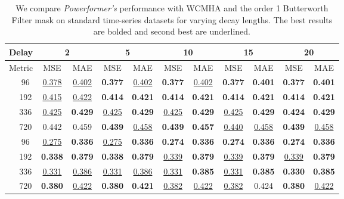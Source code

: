\begin{table*}[h]
    \centering
    \caption{We compare \emph{Powerformer's} performance with WCMHA and the order 1 Butterworth Filter mask \fbwo{} on standard time-series datasets for varying decay lengths. The best results are bolded and second best are underlined.}
    \label{tab:powerformer_butter1_results}
    \vskip 0.1in
    \begin{tabular}{c|c|cc|cc|cc|cc|cc}
	\toprule
	\multicolumn{2}{c|}{Delay}  & \multicolumn{2}{c|}{2} & \multicolumn{2}{c|}{5} & \multicolumn{2}{c|}{10} & \multicolumn{2}{c|}{15} & \multicolumn{2}{c}{20} \\
	\midrule
	\multicolumn{2}{c|}{Metric} & MSE & MAE & MSE & MAE & MSE & MAE & MSE & MAE & MSE & MAE \\
	\midrule
	\multirow{4}{*}{\rotatebox[origin=c]{90}{\text{ETTh1}}}
         & 96 &  \underline{0.378} & \underline{0.402} &  \textbf{0.377} & \underline{0.402} &  \textbf{0.377} & \underline{0.402} &  \textbf{0.377} & \textbf{0.401} &  \textbf{0.377} & \textbf{0.401} \\
	   & 192 &  \underline{0.415} & \underline{0.422} &  \textbf{0.414} & \textbf{0.421} &  \textbf{0.414} & \textbf{0.421} &  \textbf{0.414} & \textbf{0.421} &  \textbf{0.414} & \textbf{0.421} \\
		 & 336 &  \underline{0.425} & \textbf{0.429} &  \underline{0.425} & \textbf{0.429} &  \underline{0.425} & \textbf{0.429} &  \underline{0.425} & \textbf{0.429} &  \textbf{0.424} & \textbf{0.429} \\
		 & 720 &  0.442 & 0.459 &  \textbf{0.439} & \underline{0.458} &  \textbf{0.439} & \textbf{0.457} &  \underline{0.440} & \underline{0.458} &  \textbf{0.439} & \underline{0.458} \\ 
	\midrule
	\multirow{4}{*}{\rotatebox[origin=c]{90}{\text{ETTh2}}}
		 & 96 &  \underline{0.275} & \textbf{0.336} &  \underline{0.275} & \textbf{0.336} &  \textbf{0.274} & \textbf{0.336} &  \textbf{0.274} & \textbf{0.336} &  \textbf{0.274} & \textbf{0.336} \\
		 & 192 &  \textbf{0.338} & \textbf{0.379} &  \textbf{0.338} & \textbf{0.379} &  \underline{0.339} & \textbf{0.379} &  \underline{0.339} & \textbf{0.379} &  \underline{0.339} & \textbf{0.379} \\
		 & 336 &  \underline{0.331} & \underline{0.386} &  \underline{0.331} & \underline{0.386} &  \underline{0.331} & \textbf{0.385} &  \underline{0.331} & \textbf{0.385} &  \textbf{0.330} & \textbf{0.385} \\
		 & 720 &  \textbf{0.380} & \underline{0.422} &  \textbf{0.380} & \textbf{0.421} &  \underline{0.382} & \underline{0.422} &  \underline{0.382} & 0.424 &  \textbf{0.380} & \underline{0.422} \\ 

\end{tabular}
\end{table*}
